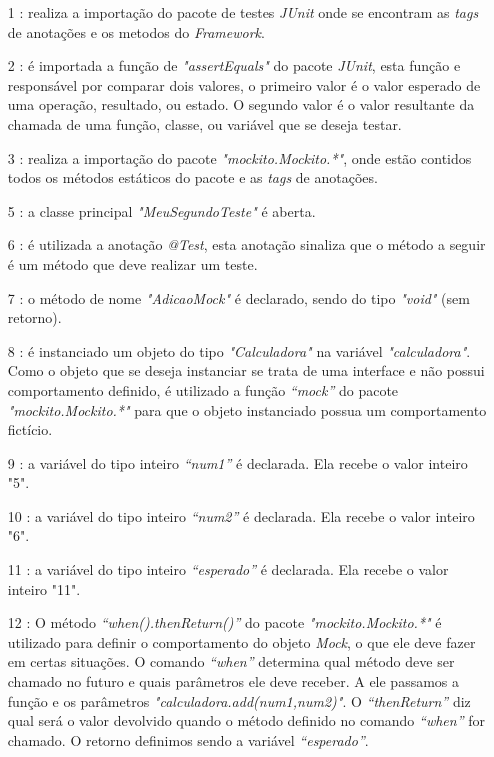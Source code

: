 \begin{itemize}

\item[1]: realiza a importação do pacote de testes \textit{JUnit} onde se encontram as \textit{tags} de anotações e os metodos do \textit{Framework}. 

\item[2]:  é importada a função de \textit{"assertEquals"} do pacote \textit{JUnit}, esta função e responsável por comparar dois valores, o primeiro valor é o valor esperado de uma operação, resultado, ou estado. O segundo valor é o valor resultante da chamada de uma função, classe, ou variável que se deseja testar. 

\item[3]: realiza a importação do pacote \textit{"mockito.Mockito.*"}, onde estão contidos todos os métodos estáticos do pacote e as \textit{tags} de anotações. 


\item[5]: a classe principal \textit{"MeuSegundoTeste"} é aberta. 

\item[6]: é utilizada a anotação \textit{@Test}, esta anotação sinaliza que o método a seguir é um método que deve realizar um teste. 

\item[7]: o método de nome \textit{"AdicaoMock"} é declarado, sendo do tipo \textit{"void"} (sem retorno). 


\item[8]: é instanciado um objeto do tipo \textit{"Calculadora"} na variável \textit{"calculadora"}. Como o objeto que se deseja instanciar se trata de uma interface e não possui comportamento definido, é utilizado a função \textit{“mock”} do pacote \textit{"mockito.Mockito.*"} para que o objeto instanciado possua um comportamento fictício. 

\item[9]: a variável do tipo inteiro \textit{“num1”} é declarada. Ela recebe o valor inteiro "5". 

\item[10]: a variável do tipo inteiro \textit{“num2”} é declarada. Ela recebe o valor inteiro "6".

\item[11]: a variável do tipo inteiro \textit{“esperado”} é declarada. Ela recebe o valor inteiro "11". 

\item[12]: O método \textit{“when().thenReturn()”} do pacote \textit{"mockito.Mockito.*"}  é utilizado para definir o comportamento do objeto \textit{Mock}, o que ele deve fazer em certas situações.
O comando \textit{“when”}  determina qual método deve ser chamado no futuro e quais parâmetros ele deve receber. A ele passamos a função e os parâmetros \textit{"calculadora.add(num1,num2)"}. O \textit{“thenReturn”} diz qual será o valor devolvido quando o método definido no comando \textit{“when”} for chamado. O retorno definimos sendo a variável \textit{“esperado”}.



\end{itemize}
